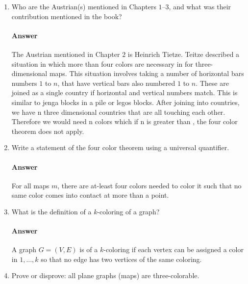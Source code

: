 \documentclass{article}
\begin{document}
\begin{enumerate}

    \item Who are the Austrian(s) mentioned in Chapters $1$--$3$, and what was
    their contribution mentioned in the book?

        \paragraph{Answer}
        The Austrian mentioned in Chapter $2$ is Heinrich Tietze. Teitze
        described a situation in which more than four colors are necessary in
        for three-dimensional maps. This situation involves taking a number of
        horizontal bars numbers $1$ to $n$, that have vertical bars also
        numbered $1$ to $n$. These are joined as a single country  if horizontal
        and vertical numbers match.
        This is similar to jenga blocks in a pile or legos blocks.
        After joining into countries, we have n three dimensional countries
         that are all touching each other.
        Therefore we would need n colors which if n is greater than ,
        the four color theorem does not apply.

    \item Write a statement of the four color theorem using a universal
        quantifier.

        \paragraph{Answer}
        For all maps $m$, there are at-least four colors needed to color it such
        that no same color comes into contact at more than a point.

    \item What is the definition of a $k$-coloring of a graph?

        \paragraph{Answer}
        A graph $G  = (V,E)$ is of a $k$-coloring if each vertex can be assigned
         a color in ${1,...,k}$ so that no edge has two vertices of the same
         coloring.

    \item Prove or disprove: all plane graphs (maps) are three-colorable.


\end{enumerate}
\end{document}
